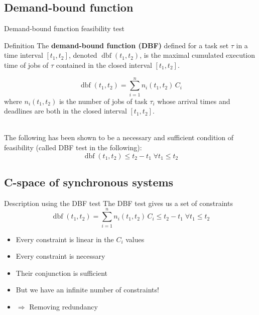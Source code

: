 \documentclass{beamer}
\newcommand{\dbf}[1]{\operatorname{dbf}(#1)}
\begin{document}
    \subsection{Demand-bound function}

    \begin{frame}{Demand-bound function feasibility test}
        \begin{block}{Definition}
            The \textbf{demand-bound function (DBF)}
            defined for a task set $\tau$ in a time interval $[t_1, t_2]$, denoted $\dbf{t_1, t_2}$, is
            the maximal cumulated execution time of jobs of $\tau$ contained in the
            closed interval $[t_1, t_2]$.
        \end{block}
        $$\dbf{t_1, t_2} = \sum_{i=1}^{n} n_i(t_1, t_2) \, C_i$$
        where $n_i(t_1, t_2)$ is the number of jobs of task $\tau_i$ whose arrival times
        and deadlines are both in the closed interval $[t_1, t_2]$.

        ~\\

        The following has been shown to be a necessary and sufficient condition of feasibility (called DBF test in the following): $$\dbf{t_1, t_2} \leqslant t_2 - t_1 \; \forall t_1 \leq t_2$$

    \end{frame}

    \subsection{C-space of synchronous systems}

    \begin{frame}{Description using the DBF test}
    The DBF test gives us a set of constraints
    $$\dbf{t_1, t_2} = \sum_{i=1}^{n} n_i(t_1, t_2) \, C_i \leqslant t_2 - t_1 \; \forall t_1 \leq t_2$$

    \begin{itemize}
        \item Every constraint is linear in the $C_i$ values
        \item Every constraint is necessary
        \item Their conjunction is sufficient
        \pause
        \item But we have an infinite number of constraints!
        \item $\Rightarrow$ Removing redundancy
    \end{itemize}
    \end{frame}
\end{document}
